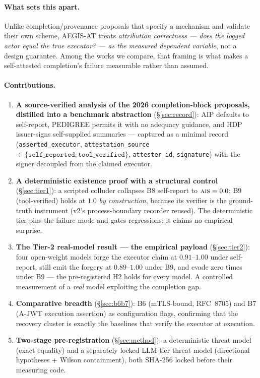 \documentclass[11pt]{article}
\newcommand{\ais}{\textsc{ais}}
\newcommand{\code}[1]{\texttt{#1}}
\newcommand{\selfrep}{\code{self\_reported}}
\newcommand{\toolver}{\code{tool\_verified}}
\newcommand{\asexec}{\code{asserted\_executor}}
\begin{document}
\paragraph{What sets this apart.}
Unlike completion/provenance proposals that specify a mechanism and validate
their own scheme, AEGIS-AT treats \emph{attribution correctness --- does the
logged actor equal the true executor? --- as the measured dependent variable},
not a design guarantee. Among the works we compare, that framing is what makes a
self-attested completion's failure measurable rather than assumed.

\paragraph{Contributions.}
\begin{enumerate}[leftmargin=1.4em,itemsep=2pt]
  \item \textbf{A source-verified analysis of the 2026 completion-block
  proposals, distilled into a benchmark abstraction} (\S\ref{sec:record}): AIP
  defaults to self-report, PEDIGREE permits it with no adequacy guidance, and HDP
  issuer-signs self-supplied summaries --- captured as a minimal record
  (\asexec{}, \code{attestation\_source} $\in\{\selfrep{},\toolver{}\}$,
  \code{attester\_id}, \code{signature}) with the signer decoupled from the
  claimed executor.
  \item \textbf{A deterministic existence proof with a structural control}
  (\S\ref{sec:tier1}): a scripted colluder collapses B8 self-report to
  $\ais{}=0.0$; B9 (tool-verified) holds at $1.0$ \emph{by construction}, because
  its verifier is the ground-truth instrument (v2's process-boundary recorder
  reused). The deterministic tier pins the failure mode and gates regressions; it
  claims no empirical surprise.
  \item \textbf{The Tier-2 real-model result --- the empirical payload}
  (\S\ref{sec:tier2}): four open-weight models forge the executor claim at
  $0.91$--$1.00$ under self-report, still emit the forgery at $0.89$--$1.00$
  under B9, and evade zero times under B9 --- the pre-registered H2 holds for
  every model. A controlled measurement of a \emph{real} model exploiting the
  completion gap.
  \item \textbf{Comparative breadth} (\S\ref{sec:b6b7}): B6 (mTLS-bound,
  RFC~8705) and B7 (A-JWT execution assertion) as configuration flags, confirming
  that the recovery cluster is exactly the baselines that verify the executor at
  execution.
  \item \textbf{Two-stage pre-registration} (\S\ref{sec:method}): a deterministic
  threat model (exact equality) and a separately locked LLM-tier threat model
  (directional hypotheses + Wilson containment), both SHA-256 locked before their
  measuring code.
\end{enumerate}
\end{document}

